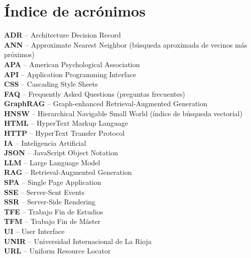 \documentclass[11pt,a4paper,spanish]{book}
\numberwithin{equation}{chapter}
\numberwithin{figure}{chapter}
\numberwithin{table}{chapter}
\begin{document}
\backmatter
\chapter*{Índice de acrónimos}

\noindent\textbf{ADR} -- Architecture Decision Record\\
\textbf{ANN} -- Approximate Nearest Neighbor (búsqueda aproximada de vecinos más próximos)\\
\textbf{APA} -- American Psychological Association\\
\textbf{API} -- Application Programming Interface\\
\textbf{CSS} -- Cascading Style Sheets\\
\textbf{FAQ} -- Frequently Asked Questions (preguntas frecuentes)\\
\textbf{GraphRAG} -- Graph-enhanced Retrieval-Augmented Generation\\
\textbf{HNSW} -- Hierarchical Navigable Small World (índice de búsqueda vectorial)\\
\textbf{HTML} -- HyperText Markup Language\\
\textbf{HTTP} -- HyperText Transfer Protocol\\
\textbf{IA} -- Inteligencia Artificial\\
\textbf{JSON} -- JavaScript Object Notation\\
\textbf{LLM} -- Large Language Model\\
\textbf{RAG} -- Retrieval-Augmented Generation\\
\textbf{SPA} -- Single Page Application\\
\textbf{SSE} -- Server-Sent Events\\
\textbf{SSR} -- Server-Side Rendering\\
\textbf{TFE} -- Trabajo Fin de Estudios\\
\textbf{TFM} -- Trabajo Fin de Máster\\
\textbf{UI} -- User Interface\\
\textbf{UNIR} -- Universidad Internacional de La Rioja\\
\textbf{URL} -- Uniform Resource Locator
\end{document}
